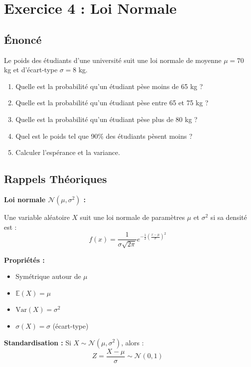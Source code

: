 \documentclass[11pt,a4paper]{article}
\newcommand{\Var}{\text{Var}}
\newcommand{\E}{\mathbb{E}}
\begin{document}
\newpage

\section{Exercice 4 : Loi Normale}

\subsection{Énoncé}

Le poids des étudiants d'une université suit une loi normale de moyenne $\mu = 70$ kg et d'écart-type $\sigma = 8$ kg.

\begin{enumerate}
    \item Quelle est la probabilité qu'un étudiant pèse moins de 65 kg ?
    \item Quelle est la probabilité qu'un étudiant pèse entre 65 et 75 kg ?
    \item Quelle est la probabilité qu'un étudiant pèse plus de 80 kg ?
    \item Quel est le poids tel que 90\% des étudiants pèsent moins ?
    \item Calculer l'espérance et la variance.
\end{enumerate}

\subsection{Rappels Théoriques}

\begin{rappelbox}
\textbf{Loi normale $\mathcal{N}(\mu, \sigma^2)$ :}

Une variable aléatoire $X$ suit une loi normale de paramètres $\mu$ et $\sigma^2$ si sa densité est :
$$f(x) = \frac{1}{\sigma\sqrt{2\pi}} e^{-\frac{1}{2}\left(\frac{x-\mu}{\sigma}\right)^2}$$

\textbf{Propriétés :}
\begin{itemize}
    \item Symétrique autour de $\mu$
    \item $\E(X) = \mu$
    \item $\Var(X) = \sigma^2$
    \item $\sigma(X) = \sigma$ (écart-type)
\end{itemize}

\textbf{Standardisation :}
Si $X \sim \mathcal{N}(\mu, \sigma^2)$, alors :
$$Z = \frac{X - \mu}{\sigma} \sim \mathcal{N}(0, 1)$$
\end{rappelbox}
\end{document}

